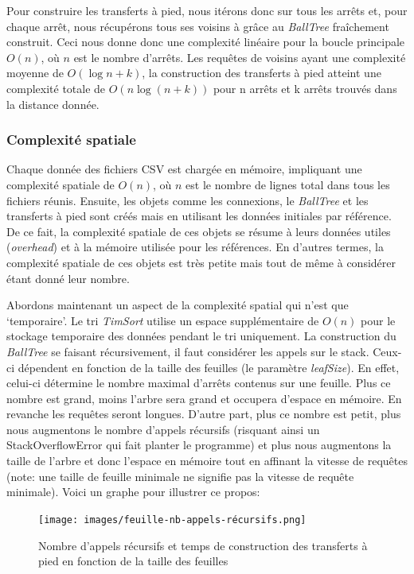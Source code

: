 \documentclass[12pt]{article}
\begin{document}
Pour construire les transferts à pied, nous itérons donc sur tous les arrêts et, pour chaque arrêt, nous récupérons tous ses voisins à grâce au \emph{BallTree} fraîchement construit. Ceci nous donne donc une complexité
linéaire pour la boucle principale $O(n)$, où $n$ est le nombre d'arrêts. Les requêtes de voisins ayant une complexité moyenne de $O(\log n + k)$, la construction des transferts à pied atteint une complexité totale de
$O(n\log(n + k))$ pour n arrêts et k arrêts trouvés dans la distance donnée.


\subsubsection{Complexité spatiale}
Chaque donnée des fichiers CSV est chargée en mémoire, impliquant une complexité spatiale de $O(n)$, où $n$ est le nombre de lignes total dans tous les fichiers réunis. Ensuite, les objets
comme les connexions, le \emph{BallTree} et les transferts à pied sont créés mais en utilisant les données initiales par référence. De ce fait, la complexité spatiale de ces objets se résume à leurs
données utiles (\emph{overhead}) et à la mémoire utilisée pour les références. En d'autres termes, la complexité spatiale de ces objets est très petite mais tout de même à considérer étant donné leur nombre.

Abordons maintenant un aspect de la complexité spatial qui n'est que `temporaire'. Le tri \emph{TimSort} utilise un espace supplémentaire de $O(n)$ pour le stockage temporaire des données pendant le tri uniquement.
La construction du \emph{BallTree} se faisant récursivement, il faut considérer les appels sur le stack. Ceux-ci dépendent en fonction de la taille des feuilles (le paramètre \emph{leafSize}). En effet, celui-ci
détermine le nombre maximal d'arrêts contenus sur une feuille. Plus ce nombre est grand, moins l'arbre sera grand et occupera d'espace en mémoire. En revanche les requêtes seront longues. D'autre part, plus ce nombre est petit,
plus nous augmentons le nombre d'appels récursifs (risquant ainsi un StackOverflowError qui fait planter le programme) et plus nous augmentons la taille de l'arbre et donc l'espace en mémoire tout en affinant la vitesse de
requêtes (note: une taille de feuille minimale ne signifie pas la vitesse de requête minimale). Voici un graphe pour illustrer ce propos:

\begin{figure}[h]
    \centering
    \texttt{[image: images/feuille-nb-appels-récursifs.png]}
    \caption{Nombre d'appels récursifs et temps de construction des transferts à pied en fonction de la taille des feuilles}
\end{figure}
\end{document}

